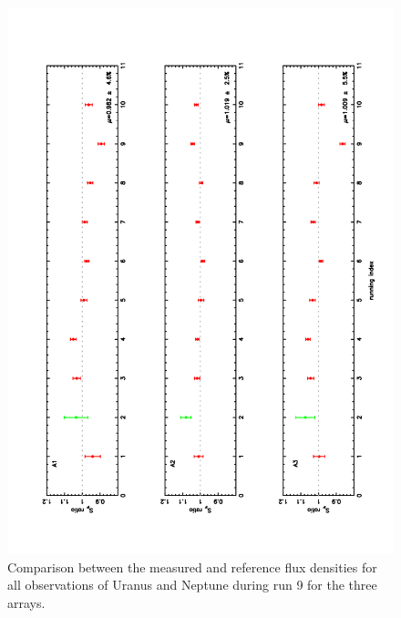 \begin{figure}
\begin{center}
  \includegraphics[clip, angle=-90, scale=0.6]{Figures/ratio_Ura_Nept.pdf}
  \caption{Comparison between the measured and reference flux densities for all observations of Uranus and Neptune during run 9
    for the three arrays.}
\label{fig:U_N_ratio}
\end{center}
\end{figure}


